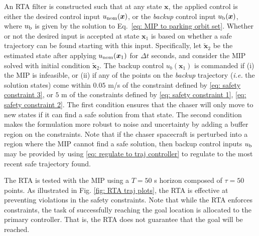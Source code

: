 \documentclass[twocolumn,letterpaper]{IEEEAerospaceCLS}  %
\theoremstyle{definition}
\begin{document}
An RTA filter is constructed such that at any state $\boldsymbol{x}$, the applied control is either the desired control input $u_{\rm nom}(\boldsymbol{x})$, or  the \emph{backup} control input $u_{\rm b}(\boldsymbol{x})$, where $u_{\rm b}$ is given by the solution to Eq.~\eqref{eq: MIP to parking orbit set}. 
Whether or not the desired input is accepted at state $\boldsymbol{x}_1$ is based on whether a safe trajectory can be found starting with this input. 
Specifically, let $\tilde{\boldsymbol{x}}_2$ be the estimated state after applying $u_{\rm nom}(\boldsymbol{x}_1)$ for $\Delta t$ seconds, and consider the MIP solved with initial condition $\tilde{\boldsymbol{x}}_2$. 
The backup control 
$u_b(\boldsymbol{x}_1)$ is commanded if (i) the MIP is infeasible, or (ii) if any of the points on the \emph{backup} trajectory (\textit{i.e.} the solution states) come within $0.05$ m/s of the constraint defined by \eqref{eq: safety constraint 3}, or $5$ m of the constraints defined by \eqref{eq: safety constraint 1}, \eqref{eq: safety constraint 2}. 
The first condition ensures that the chaser will only move to new states if it can find a safe solution from that state. 
The second condition makes the formulation more robust to noise and uncertainty by adding a buffer region on the constraints. 
Note that if the chaser spacecraft is perturbed into a region where the MIP cannot find a safe solution, then backup control inputs $u_{\rm b}$ may be provided by using \eqref{eq: regulate to traj controller} to regulate to the most recent safe trajectory found. 

The RTA is tested with the MIP using a $T=50$ s horizon composed of $\tau=50$ points.  
As illustrated in Fig. \ref{fig: RTA traj plots}, the RTA is effective at preventing violations in the safety constraints. 
Note that while the RTA enforces constraints, the task of successfully reaching the goal location is allocated to the primary controller. 
That is, the RTA does not guarantee that the goal will be reached. 




\end{document}
